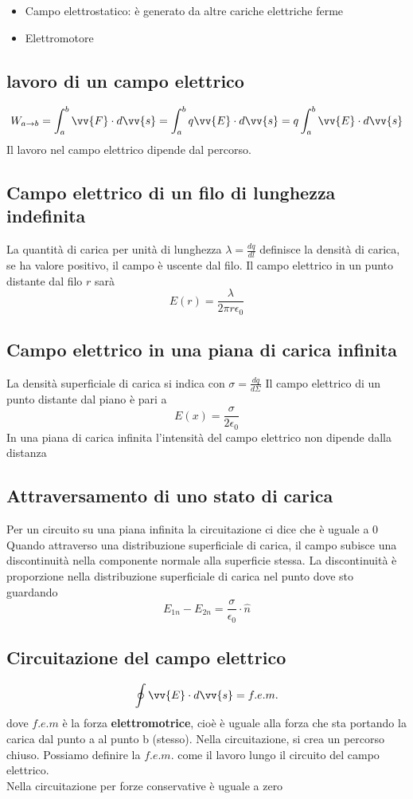 \documentclass[a4paper]{report}
\begin{document}
  \begin{itemize}
    \item Campo elettrostatico: è generato da altre cariche elettriche ferme
    \item Elettromotore
  \end{itemize}

  \subsection{lavoro di un campo elettrico}
  $$ W_{a \rightarrow b} = \int_a^b \vv{F}\cdot d\vv{s} = \int_a^b q \vv{E} \cdot d\vv{s} = q \int_a^b \vv{E}\cdot d\vv{s} $$
  Il lavoro nel campo elettrico dipende dal percorso.

  \subsection{Campo elettrico di un filo di lunghezza indefinita}
  La quantità di carica per unità di lunghezza $\lambda = \frac{dq}{dl}$ definisce la densità di carica, se ha valore positivo, il campo è uscente dal filo. Il campo elettrico in un punto distante dal filo $r$ sarà
  $$ E(r) = \frac{\lambda}{2\pi r \epsilon_0}$$

  \subsection{Campo elettrico in una piana di carica infinita}
  La densità superficiale di carica si indica con $\sigma = \frac{dq}{d\Sigma}$
  Il campo elettrico di un punto distante dal piano è pari a
  $$E(x) =  \frac{\sigma}{2 \epsilon_0} $$
  In una piana di carica infinita l'intensità del campo elettrico non dipende dalla distanza

  \subsection{Attraversamento di uno stato di carica}
  Per un circuito su una piana infinita la circuitazione ci dice che è uguale a 0\\
  Quando attraverso una distribuzione superficiale di carica, il campo subisce una discontinuità nella componente normale alla superficie stessa. La discontinuità è proporzione nella distribuzione superficiale di carica nel punto dove sto guardando\\
  $$ E_{1n} - E_{2n} = \frac{\sigma}{\epsilon_0} \cdot \hat{n}$$


  \subsection{Circuitazione del campo elettrico}
  $$\oint \vv{E} \cdot d\vv{s} = f.e.m.$$
  dove $f.e.m$ è la forza \textbf{elettromotrice}, cioè è uguale alla forza che sta portando la carica dal punto a al punto b (stesso).
  Nella circuitazione, si crea un percorso chiuso. Possiamo definire la $f.e.m.$ come il lavoro lungo il circuito del campo elettrico.\\
  Nella circuitazione per forze conservative è uguale a zero
\end{document}
